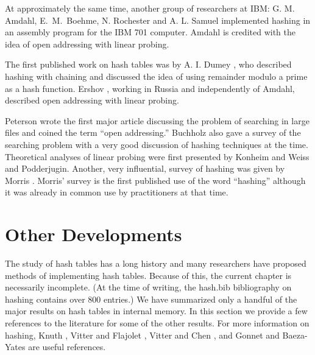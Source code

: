 At approximately the same time, another group of researchers at IBM:
G. M. Amdahl, E.~M.~Boehme, N. Rochester and A. L. Samuel implemented
hashing in an assembly program for the IBM 701 computer.  Amdahl is
credited with the idea of open addressing with linear probing.

The first published work on hash tables was by A. I. Dumey \cite{d56},
who described hashing with chaining and discussed the idea of using
remainder modulo a prime as a hash function.  Ershov \cite{e58},
working in Russia and independently of Amdahl, described open
addressing with linear probing.

Peterson \cite{p57} wrote the first major article discussing the
problem of searching in large files and coined the term ``open
addressing.''  Buchholz \cite{b63} also gave a survey of the searching
problem with a very good discussion of hashing techniques at the time.
Theoretical analyses of linear probing were first presented by Konheim
and Weiss \cite{kw66} and Podderjugin.  Another, very influential,
survey of hashing was given by Morris \cite{m68}.  Morris' survey is
the first published use of the word ``hashing'' although it was
already in common use by practitioners at that time.



\section{Other Developments}

The study of hash tables has a long history and many researchers have
proposed methods of implementing hash tables.  Because of this, the
current chapter is necessarily incomplete. (At the time of writing,
the hash.bib bibliography on hashing contains over 800 entries.) We
have summarized only a handful of the major results on hash tables in
internal memory.  In this section we provide a few references to the
literature for some of the other results.   For more information on
hashing, Knuth \cite{k97}, Vitter and Flajolet \cite{vf90}, Vitter
and Chen \cite{vc87}, and Gonnet and Baeza-Yates \cite{gb-y91}
are useful references.

